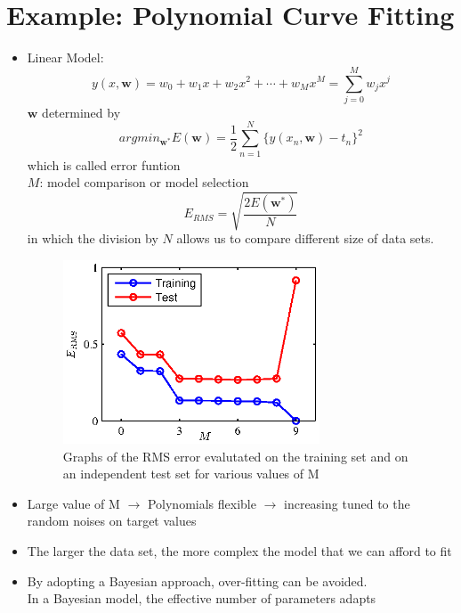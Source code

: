 \documentclass[12pt, a4paper]{article}
\begin{document}
    \section{Example: Polynomial Curve Fitting}
    \begin{itemize}
        \item Linear Model:
        \begin{equation}\label{equ:square}
            y(x,\bm{w})=w_0+w_1x+w_2x^2+\cdots+w_Mx^M=\sum_{j=0}^Mw_jx^j
        \end{equation}
        $\bm{w}$ determined by 
        \[
            argmin_{\bm{w}^*}E(\bm{w})=\frac{1}{2}\sum_{n=1}^N
            \{y(x_n,\bm{w})-t_n\}^2
        \]
        which is called error funtion\\
        $M$: model comparison or model selection\\
        \[
            E_{RMS}=\sqrt{\frac{2E(\bm{w}^*)}{N}}
            \]
        in which the division by $N$ allows us to compare different
        size of data sets.
        \begin{figure}[ht]
            \begin{center}
                \includegraphics[width=3in]{figures/Figure1_5.eps}
                \caption{Graphs of the RMS error evalutated on the training 
                set and on an independent test set for various values of M}
            \end{center}
        \end{figure}
        \item Large value of M $\rightarrow$ Polynomials 
        flexible $\rightarrow$ increasing tuned to the random
        noises on target values
        \item The larger the data set, the more complex the model that
        we can afford to fit
        \item By adopting a Bayesian approach, over-fitting can be avoided.\\
        In a Bayesian model, the effective number of parameters adapts

\end{itemize}
\end{document}
